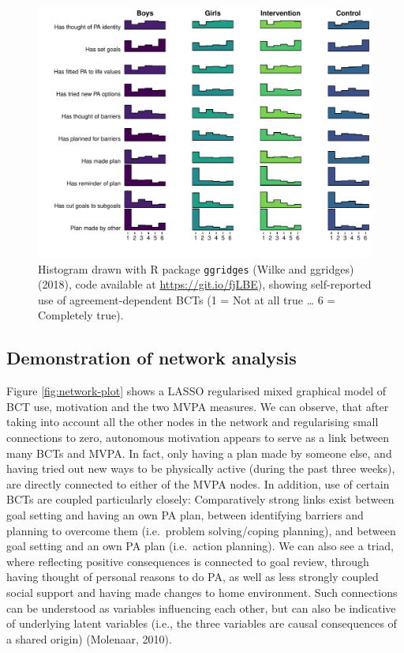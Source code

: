 \documentclass[british,man]{apa6}
\begin{document}
\begin{figure}
\centering
\includegraphics{_baseline-manuscript_files/figure-latex/histogram-agreementDependentBCTs-1.pdf}
\caption{\label{fig:histogram-agreementDependentBCTs}Histogram drawn with R package \texttt{ggridges} (Wilke and ggridges) (2018), code available at \url{https://git.io/fjLBE}), showing self-reported use of agreement-dependent BCTs (1 = Not at all true \ldots{} 6 = Completely true).}
\end{figure}

\hypertarget{demonstration-of-network-analysis}{%
\subsection{Demonstration of network analysis}\label{demonstration-of-network-analysis}}

Figure \ref{fig:network-plot} shows a LASSO regularised mixed graphical model of BCT use, motivation and the two MVPA measures. We can observe, that after taking into account all the other nodes in the network and regularising small connections to zero, autonomous motivation appears to serve as a link between many BCTs and MVPA. In fact, only having a plan made by someone else, and having tried out new ways to be physically active (during the past three weeks), are directly connected to either of the MVPA nodes. In addition, use of certain BCTs are coupled particularly closely: Comparatively strong links exist between goal setting and having an own PA plan, between identifying barriers and planning to overcome them (i.e.~problem solving/coping planning), and between goal setting and an own PA plan (i.e.~action planning). We can also see a triad, where reflecting positive consequences is connected to goal review, through having thought of personal reasons to do PA, as well as less strongly coupled social support and having made changes to home environment. Such connections can be understood as variables influencing each other, but can also be indicative of underlying latent variables (i.e., the three variables are causal consequences of a shared origin) (Molenaar, 2010).
\end{document}
